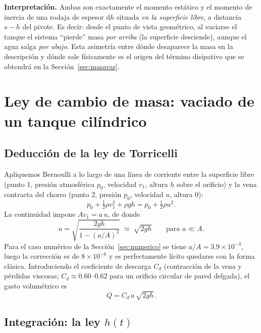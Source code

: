 \documentclass[11pt,a4paper]{article}
\newcommand{\dd}{\mathrm{d}}
\begin{document}
\textbf{Interpretación.} Ambas son exactamente el momento estático y el momento de inercia de una
rodaja de espesor $\dd h$ situada \emph{en la superficie libre}, a distancia $s-h$ del pivote.
Es decir: desde el punto de vista geométrico, al vaciarse el tanque el sistema ``pierde'' masa
\emph{por arriba} (la superficie desciende), aunque el agua salga \emph{por abajo}.
Esta asimetría entre dónde desaparece la masa en la descripción y dónde sale físicamente es el
origen del término disipativo que se obtendrá en la Sección~\ref{sec:masavar}.

\section{Ley de cambio de masa: vaciado de un tanque cilíndrico}
\label{sec:torricelli}

\subsection{Deducción de la ley de Torricelli}

Apliquemos Bernoulli a lo largo de una línea de corriente entre la superficie libre (punto 1,
presión atmosférica $p_0$, velocidad $v_1$, altura $h$ sobre el orificio) y la vena contracta del
chorro (punto 2, presión $p_0$, velocidad $u$, altura $0$):
\begin{equation}
p_0 + \tfrac12\rho v_1^2 + \rho g h = p_0 + \tfrac12 \rho u^2 .
\end{equation}
La continuidad impone $A v_1 = a\,u$, de donde
\begin{equation}
u = \sqrt{\frac{2gh}{1-(a/A)^2}} \;\simeq\; \sqrt{2gh}
\qquad\text{para } a \ll A .
\end{equation}
Para el caso numérico de la Sección~\ref{sec:numerico} se tiene $a/A = 3.9\times10^{-3}$, luego la
corrección es de $8\times10^{-6}$ y es perfectamente lícito quedarse con la forma clásica.
Introduciendo el coeficiente de descarga $C_d$ (contracción de la vena y pérdidas viscosas;
$C_d\approx 0.60$--$0.62$ para un orificio circular de pared delgada), el gasto volumétrico es
\begin{equation}
Q = C_d\,a\,\sqrt{2gh}.
\end{equation}

\subsection{Integración: la ley $h(t)$}
\end{document}

